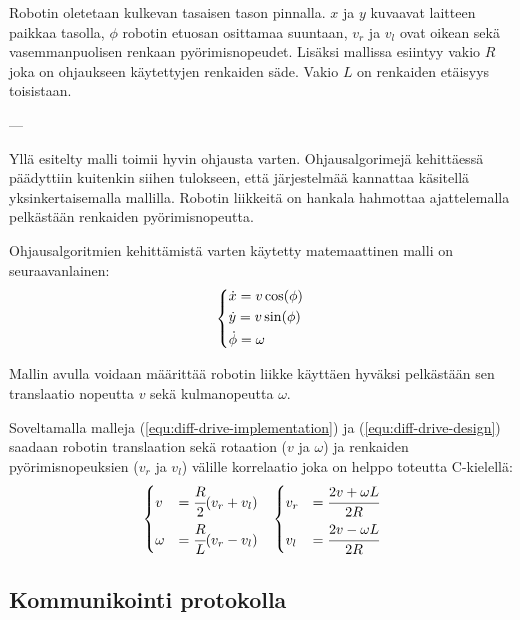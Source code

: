 \documentclass[]{article} %
\numberwithin{equation}{section}
\numberwithin{figure}{section}
\numberwithin{table}{section}
\begin{document}
Robotin oletetaan kulkevan tasaisen tason pinnalla. $x$ ja $y$ kuvaavat laitteen paikkaa tasolla, $\phi$ robotin etuosan osittamaa suuntaan, $v_r$ ja $v_l$ ovat oikean sekä vasemmanpuolisen renkaan pyörimisnopeudet. Lisäksi mallissa esiintyy vakio $R$ joka on ohjaukseen käytettyjen renkaiden säde. Vakio $L$ on renkaiden etäisyys toisistaan.


---

Yllä esitelty malli toimii hyvin ohjausta varten.
Ohjausalgorimejä kehittäessä päädyttiin kuitenkin siihen tulokseen, että järjestelmää kannattaa käsitellä  yksinkertaisemalla mallilla. Robotin liikkeitä on hankala hahmottaa ajattelemalla pelkästään renkaiden pyörimisnopeutta.

Ohjausalgoritmien kehittämistä varten käytetty matemaattinen malli on seuraavanlainen:
\begin{align}
    \label{equ:diff-drive-design}
    \begin{dcases}
        \dot x = v \cos(\phi)\\
        \dot y = v \sin(\phi)\\
        \dot \phi = \omega
    \end{dcases}
\end{align}

Mallin avulla voidaan määrittää robotin liikke käyttäen hyväksi pelkästään sen translaatio nopeutta $v$ sekä kulmanopeutta $\omega$.

Soveltamalla malleja (\ref{equ:diff-drive-implementation}) ja (\ref{equ:diff-drive-design}) saadaan robotin translaation sekä rotaation ($v$ ja $\omega$) ja renkaiden pyörimisnopeuksien ($v_r$ ja $v_l$) välille korrelaatio joka on helppo toteutta C-kielellä:
\begin{align}
    \label{equ:diff-drive-correlation}
    &
    \begin{dcases}
        v &= \cfrac{R}{2} (v_r + v_l)\\
        \omega &= \cfrac{R}{L} (v_r - v_l)\\
    \end{dcases}
    &
    \begin{dcases}
        v_r &= \cfrac{2v + \omega L}{2R}\\
        v_l &= \cfrac{2v - \omega L}{2R}\\
    \end{dcases}
\end{align}




\subsection{Kommunikointi protokolla}
\label{sec:Kommunikointi protokilla}
\end{document}
